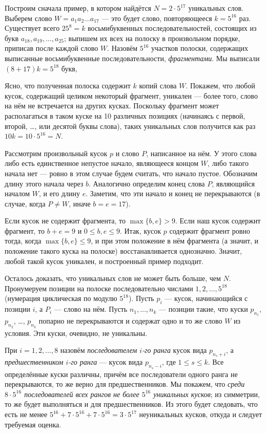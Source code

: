 \documentclass[12pt]{article}
\def\leq{\leqslant}
\begin{document}
\medskip
Построим сначала пример, в котором найдётся $N=2\cdot 5^{17}$ уникальных слов. Выберем слово $W=a_1a_2\dots a_{17}$ --- это будет слово, повторяющееся $k=5^{16}$ раз. Существует всего $25^8=k$ восьмибуквенных последовательностей, состоящих из букв $a_{18}, a_{19}, \ldots, a_{25}$; выпишем их всех на полоску в произвольном порядке, приписав после каждой слово $W$. Назовём $5^{16}$ участков полоски, содержащих выписанные восьмибуквенные последовательности, \emph{фрагментами}. Мы выписали $(8+17)k=5^{18}$ букв,

Ясно, что полученная полоска содержит $k$ копий слова $W$. Покажем, что любой кусок, содержащий целиком некоторый фрагмент, уникален --- более того, слово на нём не встречается на других кусках. Поскольку фрагмент может располагаться в таком куске на 10 различных позициях (начинаясь с первой, второй, \dots, или десятой буквы слова), таких уникальных слов получится как раз $10 k = 10\cdot 5^{16}=N$.

\smallskip
Рассмотрим произвольный кусок $p$ и слово $P$, написанное на нём. У этого слова либо есть единственное непустое начало, являющееся концом $W$, либо такого начала нет --- ровно в этом случае будем считать, что начало пустое. Обозначим длину этого начала через $b$. Аналогично определим конец слова $P$, являющийся началом $W$,  и его длину $e$. Заметим, что эти начало и конец не перекрываются (в случае, когда $P\neq W$, иначе $b=e=17$).

Если кусок не содержит фрагмента, то $\max\{b,e\}>9$. Если наш кусок содержит фрагмент, то $b+e=9$ и $0 \le b, e \le 9$. Итак, кусок $p$ содержит фрагмент ровно тогда, когда $\max\{b,e\}\leq 9$, и при этом положение в нём фрагмента (а значит, и положение такого куска на полоске) восстанавливается однозначно. Значит, любой такой кусок уникален, и построенный пример подходит.

\medskip
Осталось доказать, что уникальных слов не может быть больше, чем $N$. Пронумеруем позиции на полоске последовательно числами $1,2,\dots,5^{18}$ (нумерация циклическая по модулю $5^{18}$). Пусть  $p_i$ --- кусок, начинающийся с позиции $i$, а $P_i$ --- слово на нём. Пусть $n_1,\dots,n_k$ --- позиции такие, что куски $p_{n_1}$, $p_{n_2}$, \dots, $p_{n_k}$ попарно не перекрываются и содержат одно и то же слово $W$ из условия. Эти куски, очевидно, не уникальны.

При $i=1,2,\dots,8$ назовём \emph{последователем $i$-го ранга} кусок вида $p_{n_s+i}$, а \emph{предшественником $i$-го ранга} --- кусок вида $p_{n_s-i}$, где $1\leq s\leq k$. Все определённые куски различны, причём все последователи одного ранга не перекрываются, то же верно для предшественников. Мы покажем, что \textit{среди $8\cdot 5^{16}$ последователей всех рангов не более $5^{16}$ уникальных кусков}; из симметрии, то же будет выполняться и для предшественников. Из этого будет следовать, что есть не менее $5^{16}+7\cdot 5^{16}+7\cdot 5^{16}=3\cdot 5^{17}$ неуникальных кусков, откуда и следует требуемая оценка.
\end{document}
